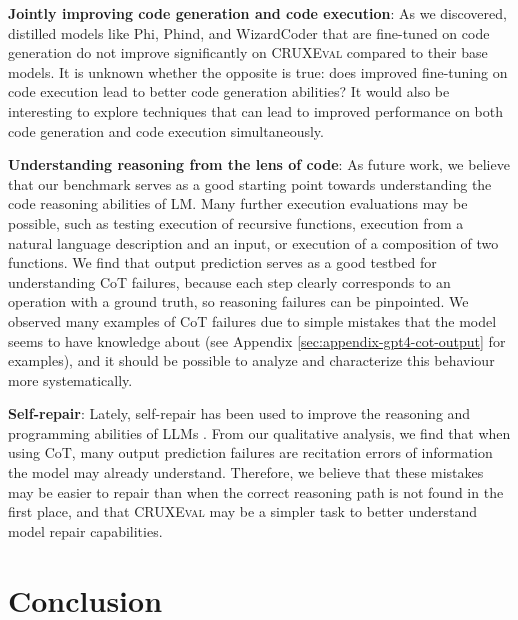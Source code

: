 \documentclass{article}
\newcommand{\benchmark}{\textsc{CRUXEval}\xspace}
\begin{document}
\textbf{Jointly improving code generation and code execution}: As we discovered, distilled models like Phi, Phind, and WizardCoder that are fine-tuned on code generation do not improve significantly on \benchmark compared to their base models. It is unknown whether the opposite is true: does improved fine-tuning on code execution lead to better code generation abilities? It would also be interesting to explore techniques that can lead to improved performance on both code generation and code execution simultaneously.

\textbf{Understanding reasoning from the lens of code}: As future work, we believe that our benchmark serves as a good starting point towards understanding the code reasoning abilities of LM. Many further execution evaluations may be possible, such as testing execution of recursive functions, execution from a natural language description and an input, or execution of a composition of two functions. We find that output prediction serves as a good testbed for understanding CoT failures, because each step clearly corresponds to an operation with a ground truth, so reasoning failures can be pinpointed. We observed many examples of CoT failures due to simple mistakes that the model seems to have knowledge about (see Appendix \ref{sec:appendix-gpt4-cot-output} for examples), and it should be possible to analyze and characterize this behaviour more systematically. 

\textbf{Self-repair}: Lately, self-repair has been used to improve the reasoning and programming abilities of LLMs \citep{chen2023teaching, olausson2023demystifying, madaan2023self, peng2023check, zhang2023self, tyen2023llms}. From our qualitative analysis, we find that when using CoT, many output prediction failures are recitation errors of information the model may already understand. Therefore, we believe that these mistakes may be easier to repair than when the correct reasoning path is not found in the first place, and that \benchmark may be a simpler task to better understand model repair capabilities.

\section{Conclusion}
\end{document}
